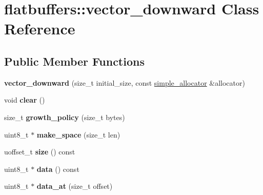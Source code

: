 \hypertarget{classflatbuffers_1_1vector__downward}{}\section{flatbuffers\+:\+:vector\+\_\+downward Class Reference}
\label{classflatbuffers_1_1vector__downward}
\subsection*{Public Member Functions}
\begin{DoxyCompactItemize}
\item 
\mbox{\label{classflatbuffers_1_1vector__downward_a0f044a6fcdd12b2c6bc92224b3abeede}} 
{\bfseries vector\+\_\+downward} (size\+\_\+t initial\+\_\+size, const \hyperlink{classflatbuffers_1_1simple__allocator}{simple\+\_\+allocator} \&allocator)
\item 
\mbox{\label{classflatbuffers_1_1vector__downward_ae701e8e1cc468d1a3141e0fa22dc3a70}} 
void {\bfseries clear} ()
\item 
\mbox{\label{classflatbuffers_1_1vector__downward_a00f9fca894e2a2963ae0867ff443d0c2}} 
size\+\_\+t {\bfseries growth\+\_\+policy} (size\+\_\+t bytes)
\item 
\mbox{\label{classflatbuffers_1_1vector__downward_a4a0686bb0afe2feefec0502f527a11bf}} 
uint8\+\_\+t $\ast$ {\bfseries make\+\_\+space} (size\+\_\+t len)
\item 
\mbox{\label{classflatbuffers_1_1vector__downward_a70c8de02d393caddcedde603a5a45ae7}} 
uoffset\+\_\+t {\bfseries size} () const
\item 
\mbox{\label{classflatbuffers_1_1vector__downward_aa1f13e25b0c619ba9a9c2d6b408e2587}} 
uint8\+\_\+t $\ast$ {\bfseries data} () const
\item 
\mbox{\label{classflatbuffers_1_1vector__downward_ae4ce8abc92218d53b2a3f37628ce4662}} 
uint8\+\_\+t $\ast$ {\bfseries data\+\_\+at} (size\+\_\+t offset)

\end{DoxyCompactItemize}

